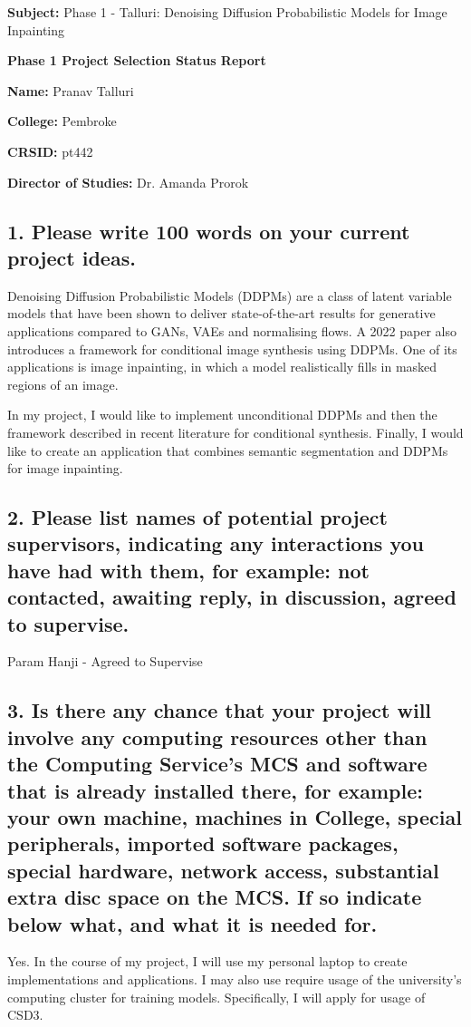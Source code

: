 \documentclass{article}
\begin{document}
\noindent\textbf{Subject:} Phase 1 - Talluri: Denoising Diffusion Probabilistic Models for Image Inpainting

\noindent\textbf{Phase 1 Project Selection Status Report}

\noindent\textbf{Name:} Pranav Talluri

\noindent\textbf{College:} Pembroke

\noindent\textbf{CRSID:} pt442

\noindent\textbf{Director of Studies:} Dr. Amanda Prorok

\subsection*{1. Please write 100 words on your current project ideas.}

Denoising Diffusion Probabilistic Models (DDPMs) are a class of latent variable models that have been shown to deliver state-of-the-art results for generative applications compared to GANs, VAEs and normalising flows. A 2022 paper also introduces a framework for conditional image synthesis using DDPMs. One of its applications is image inpainting, in which a model realistically fills in masked regions of an image.

In my project, I would like to implement unconditional DDPMs and then the framework described in recent literature for conditional synthesis. Finally, I would like to create an application that combines semantic segmentation and DDPMs for image inpainting.

\subsection*{2. Please list names of potential project supervisors, indicating
any interactions you have had with them, for example: not
contacted, awaiting reply, in discussion, agreed to supervise.}

Param Hanji - Agreed to Supervise

\subsection*{3. Is there any chance that your project will involve any
computing resources other than the Computing Service's MCS and
software that is already installed there, for example: your own
machine, machines in College, special peripherals, imported
software packages, special hardware, network access, substantial
extra disc space on the MCS. If so indicate below what, and what it is needed for.}

Yes. In the course of my project, I will use my personal laptop to create implementations and applications. I may also use require usage of the university's computing cluster for training models. Specifically, I will apply for usage of CSD3.
\end{document}
